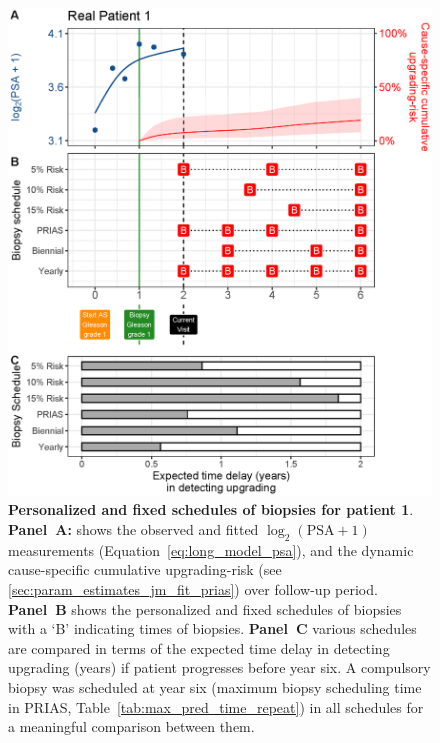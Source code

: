\begin{figure}
\centerline{\includegraphics[width=\columnwidth]{images/demo_pat1_supp.eps}}
\caption{\textbf{Personalized and fixed schedules of biopsies for patient 1}. \textbf{Panel~A:} shows the observed and fitted $\log_2(\mbox{PSA} + 1)$ measurements (Equation~\ref{eq:long_model_psa}), and the dynamic cause-specific cumulative upgrading-risk (see \ref{sec:param_estimates_jm_fit_prias}) over follow-up period. \textbf{Panel~B} shows the personalized and fixed schedules of biopsies with a `B' indicating times of biopsies. \textbf{Panel~C} various schedules are compared in terms of the expected time delay in detecting upgrading (years) if patient progresses before year six. A compulsory biopsy was scheduled at year six (maximum biopsy scheduling time in PRIAS, Table~\ref{tab:max_pred_time_repeat}) in all schedules for a meaningful comparison between them.}
\label{fig:demo_pat1_supp}
\end{figure}

